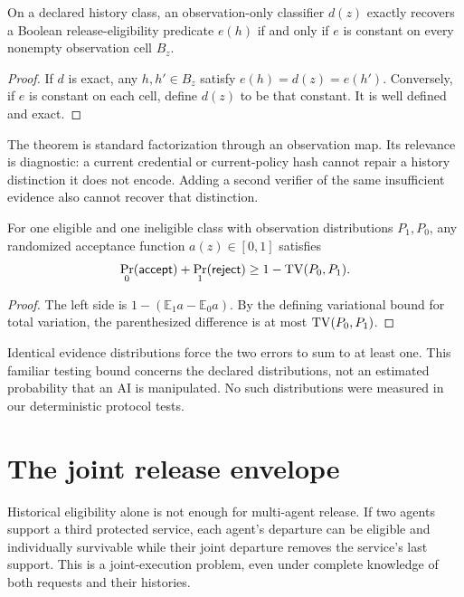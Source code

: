 \begin{theorem}
On a declared history class, an observation-only classifier $d(z)$ exactly recovers a Boolean release-eligibility predicate $e(h)$ if and only if $e$ is constant on every nonempty observation cell $B_z$.
\end{theorem}
\begin{proof}
If $d$ is exact, any $h,h'\in B_z$ satisfy $e(h)=d(z)=e(h')$. Conversely, if $e$ is constant on each cell, define $d(z)$ to be that constant. It is well defined and exact.
\end{proof}

The theorem is standard factorization through an observation map. Its relevance is diagnostic: a current credential or current-policy hash cannot repair a history distinction it does not encode. Adding a second verifier of the same insufficient evidence also cannot recover that distinction.

\begin{corollary}
For one eligible and one ineligible class with observation distributions $P_1,P_0$, any randomized acceptance function $a(z)\in[0,1]$ satisfies
\begin{equation}
\Pr_0(\mathsf{accept})+\Pr_1(\mathsf{reject})
\geq 1-\operatorname{TV}(P_0,P_1).
\label{eq:tv}
\end{equation}
\end{corollary}
\begin{proof}
The left side is $1-(\mathbb E_1a-\mathbb E_0a)$. By the defining variational bound for total variation, the parenthesized difference is at most $\operatorname{TV}(P_0,P_1)$.
\end{proof}

Identical evidence distributions force the two errors to sum to at least one. This familiar testing bound concerns the declared distributions, not an estimated probability that an AI is manipulated. No such distributions were measured in our deterministic protocol tests.

\section{The joint release envelope}
\label{sec:envelope}
Historical eligibility alone is not enough for multi-agent release. If two agents support a third protected service, each agent's departure can be eligible and individually survivable while their joint departure removes the service's last support. This is a joint-execution problem, even under complete knowledge of both requests and their histories.

